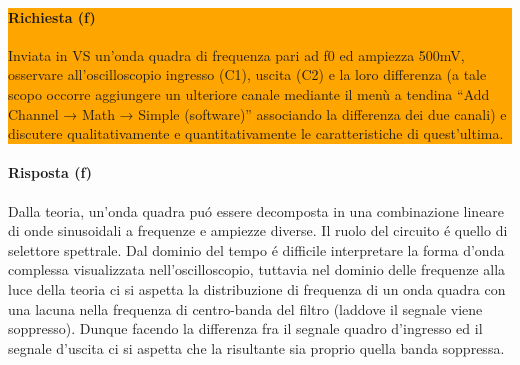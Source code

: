 \noindent\colorbox{orange}{
  \begin{minipage}{1.0\linewidth}
    \paragraph{Richiesta (f)}
    Inviata in VS un'onda quadra di frequenza pari ad f0 ed ampiezza 500mV,
    osservare all'oscilloscopio ingresso (C1), uscita (C2) e la loro differenza (a tale scopo
    occorre aggiungere un ulteriore canale mediante il menù a tendina ``Add Channel →
    Math → Simple (software)'' associando la differenza dei due canali) e discutere
    qualitativamente e quantitativamente le caratteristiche di quest'ultima.
  \end{minipage}
}
\paragraph{Risposta (f)}
Dalla teoria, un'onda quadra pu\'o essere decomposta in una combinazione lineare di onde
sinusoidali a frequenze e ampiezze diverse. Il ruolo del circuito \'e quello di selettore
spettrale. Dal dominio del tempo \'e difficile interpretare la forma d'onda complessa
visualizzata nell'oscilloscopio, tuttavia nel dominio delle frequenze alla luce della teoria
ci si aspetta la distribuzione di frequenza di un onda quadra con una lacuna nella
frequenza di centro-banda del filtro (laddove il segnale viene soppresso). Dunque facendo
la differenza fra il segnale quadro d'ingresso ed il segnale d'uscita ci si aspetta che
la risultante sia proprio quella banda soppressa.
